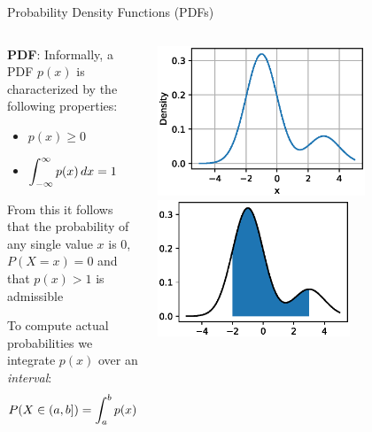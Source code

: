 {    \begin{frame}{Probability Density Functions (PDFs)}
        \begin{columns}[onlytextwidth]
            \begin{column}{0.55\textwidth}
                \begin{boxed}
                    \textbf{PDF}:
                    Informally, a PDF $p(x)$ is characterized by the following properties:
                    \begin{itemize}
                        \item ${\displaystyle p(x) \geq 0 }$
                        \item ${\displaystyle \int_{-\infty}^{\infty} p(x)  \mathop{dx} = 1 }$
                    \end{itemize}
                    From this it follows that the probability of any single value $x$
                    is $0$, $P(X = x) = 0$ and that $p(x) > 1$ is admissible
                \end{boxed}

                To compute actual probabilities we integrate $p(x)$ over an \emph{interval}:
                $$P(X\in(a, b]) = \int _ {a}^{b} p(x) \mathop{dx}$$
            \end{column}
            \begin{column}{0.45\textwidth}
                \centering
                \includegraphics[width=0.70\textwidth]{fig/prob_density_1.eps}
                \hspace*{2mm}\includegraphics[width=0.65\textwidth]{fig/prob_density_2.eps}
            \end{column}
        \end{columns}
    \end{frame}

}
